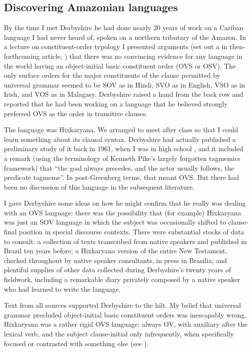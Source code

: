 \documentclass[output=paper,colorlinks,citecolor=brown
]{langscibook}
\begin{document}
\subsection{Discovering Amazonian languages}
\label{sec-discovering-amazonian}

By the time I met Derbyshire he had done nearly 20 years of work on
a Cariban language I had never heard of, spoken on a northern tributary
of the Amazon. In a lecture on constituent-order typology I presented
arguments (set out a in then-forthcoming article, \citealt{Pullum77})
that there was no convincing evidence for any language in the world
having an object-initial basic constituent order (OVS or OSV). The
only surface orders for the major constituents of the clause permitted
by universal grammar seemed to be SOV as in Hindi, SVO as in English,
VSO as in Irish, and VOS as in Malagasy. Derbyshire raised a hand
from the back row and reported that he had been working on a language
that he believed strongly preferred OVS as the order in transitive
clauses.

The language was Hixkaryana. We arranged to meet after class so that
I could learn something about its clausal syntax. Derbyshire had actually
published a preliminary study of it back in 1961, when I was in high
school \citep{Derbyshire61}, and it included a remark (using the
terminology of Kenneth Pike's largely forgotten tagmemics framework)
that ``the goal always precedes, and the actor usually follows, the
predicate tagmeme''. In post-Greenberg terms, that meant OVS. But
there had been no discussion of this language in the subsequent
literature.

I gave Derbyshire some ideas on how he might confirm that he really
was dealing with an OVS language: there was the possibility that
(for example) Hixkaryana was just an SOV language in which the subject
was occasionally shifted to clause-final position in special discourse
contexts. There were substantial stocks of data to consult: a
collection of texts transcribed from native speakers and published
in Brazil ten years before; a Hixkaryana version of the entire New
Testament, checked throughout by native speaker consultants, in press
in Brasilia; and plentiful supplies of other data collected during
Derbyshire's twenty years of fieldwork, including a remarkable diary
privately composed by a native speaker who had learned to write the
language.

Text from all sources supported Derbyshire to the hilt. My belief
that universal grammar precluded object-initial basic constituent
orders was inescapably wrong. Hixkaryana was a rather rigid OVS
language: always OV, with auxiliary after the lexical verb, and
the subject clause-initial only infrequently, when specifically
focused or contrasted with something else (see
\citealt[74]{Derbyshire85}).
\end{document}

